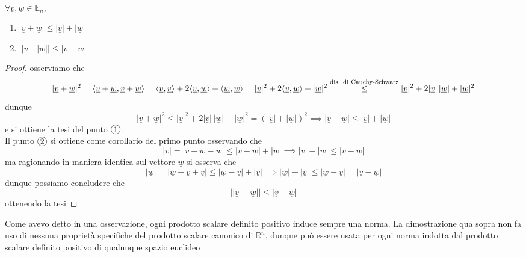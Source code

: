 \documentclass[openany, italian]{book}
\begin{document}
\begin{prop} \hfill \\
$ \forall \underline{v}, \underline{w} \in \mathbb{E}_n, $
\begin{enumerate}[label=\protect\circled{\arabic*}]
	\item $|\underline{v} + \underline{w}| \leq |\underline{v}| + |\underline{w}|$
	\item $||\underline{v}| - |\underline{w}|| \leq |\underline{v} - \underline{w}|$
\end{enumerate}
\label{prop:dis_triang}
\end{prop}
\begin{proof}
osserviamo che
$$
|\underline{v} + \underline{w}|^2 = \langle \underline{v} + \underline{w}, \underline{v} + \underline{w} \rangle = \langle \underline{v}, \underline{v} \rangle + 2\langle \underline{v}, \underline{w} \rangle + \langle \underline{w}, \underline{w} \rangle = |\underline{v}|^2 + 2 \langle \underline{v}, \underline{w} \rangle + |\underline{w}|^2 \stackrel{\text{dis. di Cauchy-Schwarz}}{\leq} |\underline{v}|^2 + 2|\underline{v}| \, |\underline{w}| + |\underline{w}|^2
$$
dunque
$$
|\underline{v} + \underline{w}|^2 \leq |\underline{v}|^2 + 2|\underline{v}| \, |\underline{w}| + |\underline{w}|^2 = (|\underline{v}| + |\underline{w}|)^2 \implies |\underline{v} + \underline{w}| \leq |\underline{v}| + |\underline{w}|
$$
e si ottiene la tesi del punto $\circled{1}$. \\
Il punto $\circled{2}$ si ottiene come corollario del primo punto osservando che
$$
|\underline{v}| = |\underline{v} + \underline{w} - \underline{w}| \leq |\underline{v} - \underline{w}| + |\underline{w}| \implies |\underline{v}| - |\underline{w}| \leq |\underline{v} - \underline{w}| 
$$
ma ragionando in maniera identica sul vettore $\underline{w}$ si osserva che
$$
|\underline{w}| = |\underline{w} - \underline{v} + \underline{v}| \leq |\underline{w} - \underline{v}| + |\underline{v}| \implies |\underline{w}| - |\underline{v}| \leq |\underline{w} - \underline{v}|= |\underline{v} - \underline{w}|
$$
dunque possiamo concludere che
$$
||\underline{v}| - |\underline{w}|| \leq |\underline{v} - \underline{w}|
$$
ottenendo la tesi
\end{proof}
\begin{remark}
Come avevo detto in una osservazione, ogni prodotto scalare definito positivo induce sempre una norma. La dimostrazione qua sopra non fa uso di nessuna proprietà specifiche del prodotto scalare canonico di $\mathbb{R}^n$, dunque può essere usata per ogni norma indotta dal prodotto scalare definito positivo di qualunque spazio euclideo
\end{remark}
\end{document}
